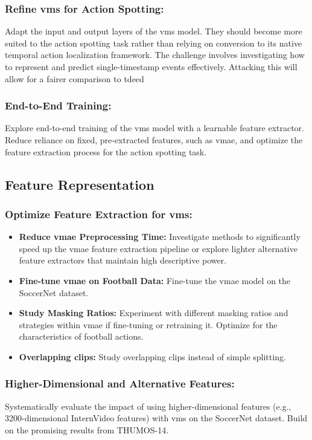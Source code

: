 \subsubsection{Refine \acrshort{vms} for Action Spotting:} 
Adapt the input and output layers of the \acrshort{vms} model. They should become more suited to the action spotting task rather than relying on conversion to its native temporal action localization framework. The challenge involves investigating how to represent and predict single-timestamp events effectively. Attacking this will allow for a fairer comparison to \acrshort{tdeed}

\subsubsection{End-to-End Training:} 
Explore end-to-end training of the \acrshort{vms} model with a learnable feature extractor. Reduce reliance on fixed, pre-extracted features, such as \acrshort{vmae}, and optimize the feature extraction process for the action spotting task.


\subsection{Feature Representation}

\subsubsection{Optimize Feature Extraction for \acrshort{vms}:}
    \begin{itemize}
        \item \textbf{Reduce \acrshort{vmae} Preprocessing Time:} Investigate methods to significantly speed up the \acrshort{vmae} feature extraction pipeline or explore lighter alternative feature extractors that maintain high descriptive power.
        \item \textbf{Fine-tune \acrshort{vmae} on Football Data:} Fine-tune the \acrshort{vmae} model on the SoccerNet dataset.
        \item \textbf{Study Masking Ratios:} Experiment with different masking ratios and strategies within \acrshort{vmae} if fine-tuning or retraining it. Optimize for the characteristics of football actions.
        \item \textbf{Overlapping clips:} Study overlapping clips instead of simple splitting. 
    \end{itemize}
    
\subsubsection{Higher-Dimensional and Alternative Features:} 
Systematically evaluate the impact of using higher-dimensional features (e.g., 3200-dimensional InternVideo features) with \acrshort{vms} on the SoccerNet dataset. Build on the promising results from THUMOS-14.

